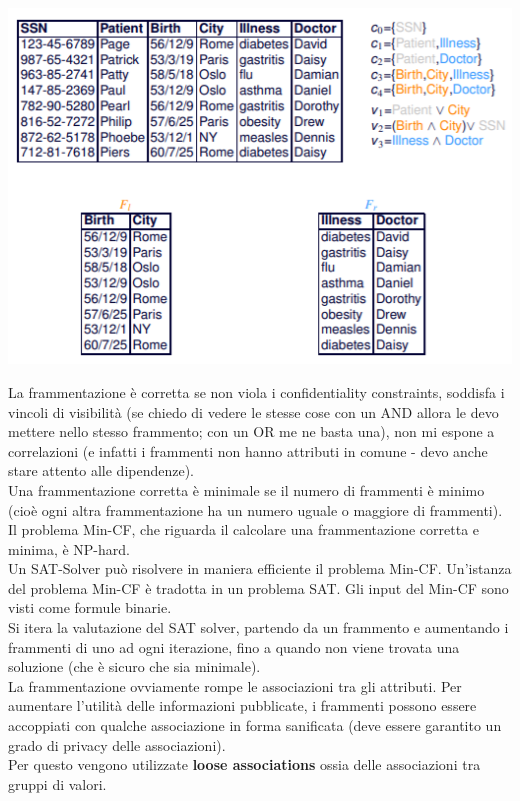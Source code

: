 \begin{center}
    \includegraphics[scale=0.8]{img/fragex.png}
\end{center}
La frammentazione è corretta se non viola i confidentiality constraints, soddisfa i vincoli di visibilità (se chiedo di vedere le stesse cose con un AND allora le devo mettere nello stesso frammento; con un OR me ne basta una), non mi espone a correlazioni (e infatti i frammenti non hanno attributi in comune - devo anche stare attento alle dipendenze).\\
Una frammentazione corretta è minimale se il numero di frammenti è minimo (cioè ogni altra frammentazione ha un numero uguale o maggiore di frammenti). \\
Il problema Min-CF, che riguarda il calcolare una frammentazione corretta e minima, è NP-hard.\\
Un SAT-Solver può risolvere in maniera efficiente il problema Min-CF. Un'istanza del problema Min-CF è tradotta in un problema SAT. Gli input del Min-CF sono visti come formule binarie.\\
Si itera la valutazione del SAT solver, partendo da un frammento e aumentando i frammenti di uno ad ogni iterazione, fino a quando non viene trovata una soluzione (che è sicuro che sia minimale). \\
La frammentazione ovviamente rompe le associazioni tra gli attributi. Per aumentare l'utilità delle informazioni pubblicate, i frammenti possono essere accoppiati con qualche associazione in forma sanificata (deve essere garantito un grado di privacy delle associazioni).\\
Per questo vengono utilizzate \textbf{loose associations} ossia delle associazioni tra gruppi di valori.\\
